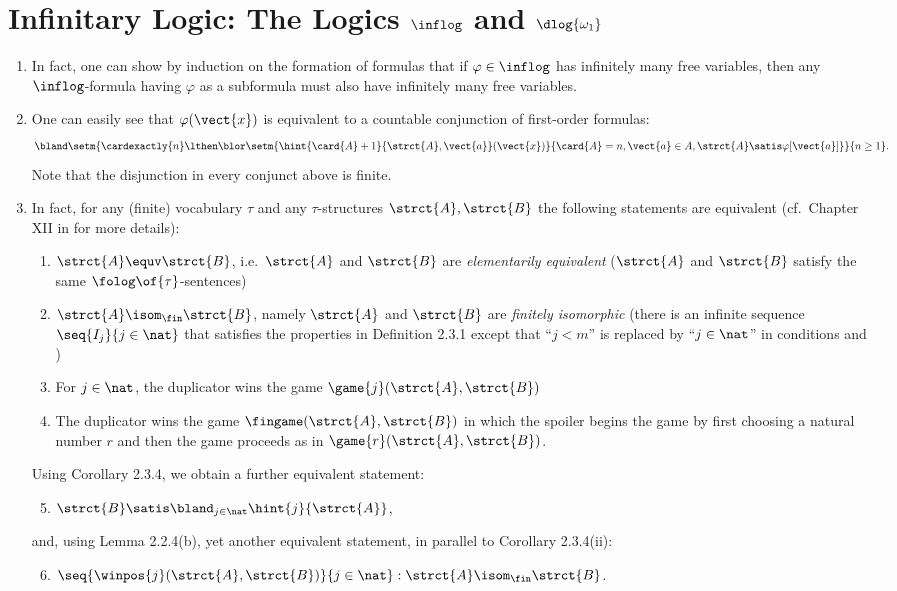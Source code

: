 \section{Infinitary Logic: The Logics $\inflog$ and $\dlog{\omega_1}$}
\begin{enumerate}[1.]
%
\item {} In fact, one can show by induction on the formation of formulas that if $\varphi \in \inflog$ has infinitely many free variables, then any $\inflog$-formula having $\varphi$ as a subformula must also have infinitely many free variables.
%
\item {} One can easily see that $\varphi(\vect{x})$ is equivalent to a countable conjunction of first-order formulas:
\[
\bland \setm{\cardexactly{n} \lthen \blor\setm{\hint{\card{A} + 1}{\strct{A}, \vect{a}}(\vect{x})}{\card{A} = n, \vect{a} \in A, \strct{A} \satis \varphi[\vect{a}]}}{n \geq 1}.
\]
Note that the disjunction in every conjunct above is finite.
%
\item {} In fact, for any (finite) vocabulary $\tau$ and any $\tau$-structures $\strct{A}, \strct{B}$ the following statements are equivalent (cf.\ Chapter XII in \cite{EFT} for more details):
\begin{enumerate}[(1)]
\item $\strct{A} \equv \strct{B}$, i.e.\ $\strct{A}$ and $\strct{B}$ are \emph{elementarily equivalent} ($\strct{A}$ and $\strct{B}$ satisfy the same $\folog\of{\tau}$-sentences)
\item $\strct{A} \isom_\fin \strct{B}$, namely $\strct{A}$ and $\strct{B}$ are \emph{finitely isomorphic} (there is an infinite sequence $\seq{I_j}{j \in \nat}$ that satisfies the properties  in Definition 2.3.1 except that ``$j < m$'' is replaced by ``$j \in \nat$'' in conditions  and )
\item For $j \in \nat$, the duplicator wins the game $\game{j}(\strct{A}, \strct{B})$
\item The duplicator wins the game $\fingame(\strct{A}, \strct{B})$ in which the spoiler begins the game by first choosing a natural number $r$ and then the game proceeds as in $\game{r}(\strct{A}, \strct{B})$.
\end{enumerate}
Using Corollary 2.3.4, we obtain a further equivalent statement:
\begin{enumerate}[(1)]
\setcounter{enumii}{4}
\item $\strct{B} \satis \bland_{j \in \nat} \hint{j}{\strct{A}}$,
\end{enumerate}
and, using Lemma 2.2.4(b), yet another equivalent statement, in parallel to Corollary 2.3.4(ii):
\begin{enumerate}[(1)]
\setcounter{enumii}{5}
\item $\seq{\winpos{j}(\strct{A}, \strct{B})}{j \in \nat} : \strct{A} \isom_\fin \strct{B}$.
\end{enumerate}


\end{enumerate}
